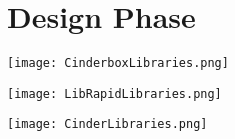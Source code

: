 \section{Design Phase} \label{designPhase}

\begin{center}
	\begin{figure*}[htp]
		\texttt{[image: CinderboxLibraries.png]}
	\end{figure*}
\end{center}

\begin{center}
	\begin{figure*}[htp]
		\texttt{[image: LibRapidLibraries.png]}
	\end{figure*}
\end{center}

\begin{center}
	\begin{figure*}[htp]
		\texttt{[image: CinderLibraries.png]}
	\end{figure*}
\end{center}


